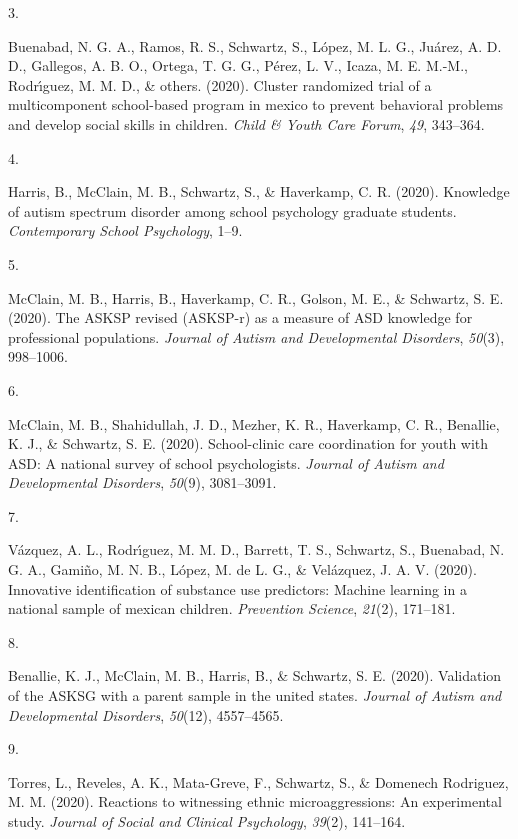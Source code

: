 \documentclass[11pt,a4paper,]{moderncv}
\newlength{\csllabelwidth}
\newcommand{\CSLLeftMargin}[1]{\parbox[t]{\csllabelwidth}{#1}}
\newcommand{\CSLRightInline}[1]{\parbox[t]{\linewidth - \csllabelwidth}{#1}}
\begin{document}
\leavevmode\hypertarget{ref-buenabad2020cluster}{}%
\CSLLeftMargin{3. }
\CSLRightInline{Buenabad, N. G. A., Ramos, R. S., Schwartz, S., López,
M. L. G., Juárez, A. D. D., Gallegos, A. B. O., Ortega, T. G. G., Pérez,
L. V., Icaza, M. E. M.-M., Rodrı́guez, M. M. D., \& others. (2020).
Cluster randomized trial of a multicomponent school-based program in
mexico to prevent behavioral problems and develop social skills in
children. \emph{Child \& Youth Care Forum}, \emph{49}, 343--364.}

\leavevmode\hypertarget{ref-harris2020knowledge}{}%
\CSLLeftMargin{4. }
\CSLRightInline{Harris, B., McClain, M. B., Schwartz, S., \& Haverkamp,
C. R. (2020). Knowledge of autism spectrum disorder among school
psychology graduate students. \emph{Contemporary School Psychology},
1--9.}

\leavevmode\hypertarget{ref-mcclain2020asksp}{}%
\CSLLeftMargin{5. }
\CSLRightInline{McClain, M. B., Harris, B., Haverkamp, C. R., Golson, M.
E., \& Schwartz, S. E. (2020). The ASKSP revised (ASKSP-r) as a measure
of ASD knowledge for professional populations. \emph{Journal of Autism
and Developmental Disorders}, \emph{50}(3), 998--1006.}

\leavevmode\hypertarget{ref-mcclain2020school}{}%
\CSLLeftMargin{6. }
\CSLRightInline{McClain, M. B., Shahidullah, J. D., Mezher, K. R.,
Haverkamp, C. R., Benallie, K. J., \& Schwartz, S. E. (2020).
School-clinic care coordination for youth with ASD: A national survey of
school psychologists. \emph{Journal of Autism and Developmental
Disorders}, \emph{50}(9), 3081--3091.}

\leavevmode\hypertarget{ref-vazquez2020innovative}{}%
\CSLLeftMargin{7. }
\CSLRightInline{Vázquez, A. L., Rodrı́guez, M. M. D., Barrett, T. S.,
Schwartz, S., Buenabad, N. G. A., Gamiño, M. N. B., López, M. de L. G.,
\& Velázquez, J. A. V. (2020). Innovative identification of substance
use predictors: Machine learning in a national sample of mexican
children. \emph{Prevention Science}, \emph{21}(2), 171--181.}

\leavevmode\hypertarget{ref-benallie2020validation}{}%
\CSLLeftMargin{8. }
\CSLRightInline{Benallie, K. J., McClain, M. B., Harris, B., \&
Schwartz, S. E. (2020). Validation of the ASKSG with a parent sample in
the united states. \emph{Journal of Autism and Developmental Disorders},
\emph{50}(12), 4557--4565.}

\leavevmode\hypertarget{ref-torres2020reactions}{}%
\CSLLeftMargin{9. }
\CSLRightInline{Torres, L., Reveles, A. K., Mata-Greve, F., Schwartz,
S., \& Domenech Rodriguez, M. M. (2020). Reactions to witnessing ethnic
microaggressions: An experimental study. \emph{Journal of Social and
Clinical Psychology}, \emph{39}(2), 141--164.}
\end{document}
